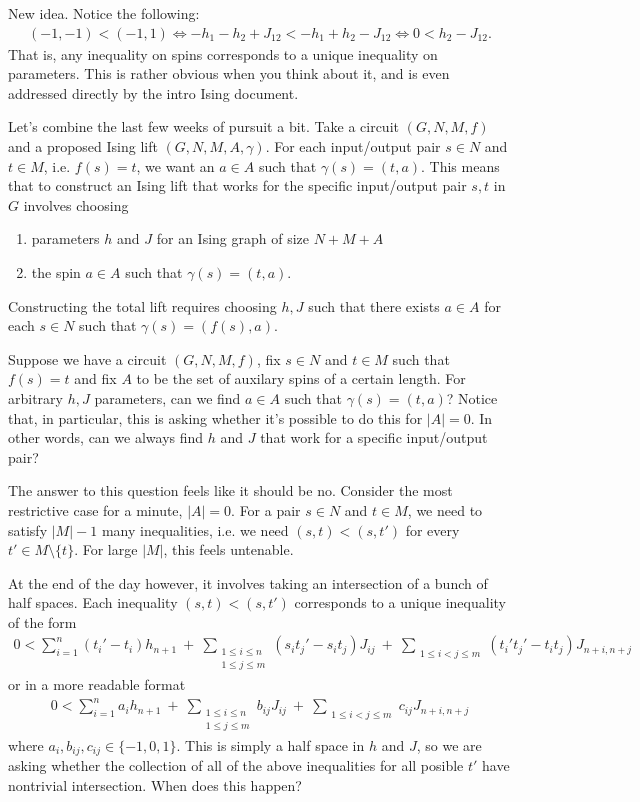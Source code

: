 New idea. Notice the following:
\begin{align*}
	(-1,-1) < (-1,1) \iff -h_1 - h_2 + J_{12} < -h_1 + h_2 - J_{12} \iff 0 < h_2 - J_{12}.
\end{align*}
That is, any inequality on spins corresponds to a unique inequality on parameters. This is rather obvious when you think about it, and is even addressed directly by the intro Ising document.

\newpage
{}
Let's combine the last few weeks of pursuit a bit. Take a circuit $(G,N,M,f)$ and a proposed Ising lift $(G,N,M,A,\gamma)$. For each input/output pair $s \in N$ and $t \in M$, i.e. $f(s) = t$, we want an $a \in A$ such that $\gamma(s) = (t,a)$. This means that to construct an Ising lift that works for the specific input/output pair $s,t$ in $G$ involves choosing
\begin{enumerate}[(1)]
	\item parameters $h$ and $J$ for an Ising graph of size $N + M + A$
	\item the spin $a \in A$ such that $\gamma(s) = (t,a)$.
\end{enumerate}
Constructing the total lift requires choosing $h,J$ such that there exists $a \in A$ for each $s \in N$ such that $\gamma(s) = (f(s),a)$.

\begin{question}\label{q:given-h-J-exist-a}
	Suppose we have a circuit $(G,N,M,f)$, fix $s \in N$ and $t \in M$ such that $f(s) = t$ and fix $A$ to be the set of auxilary spins of a certain length. For arbitrary $h,J$ parameters, can we find $a \in A$ such that $\gamma(s) = (t,a)$? Notice that, in particular, this is asking whether it's possible to do this for $|A| = 0$. In other words, can we always find $h$ and $J$ that work for a specific input/output pair?
\end{question}
The answer to this question feels like it should be no. Consider the most restrictive case for a minute, $|A| = 0$. For a pair $s \in N$ and $t \in M$, we need to satisfy $|M| - 1$ many inequalities, i.e. we need $(s,t) < (s,t')$ for every $t' \in M \setminus \{t\}$. For large $|M|$, this feels untenable.

At the end of the day however, it involves taking an intersection of a bunch of half spaces. Each inequality $(s,t) < (s,t')$ corresponds to a unique inequality of the form
\begin{align*}
	0 < \sum_{i = 1}^n (t_i' - t_i)h_{n+1} ~+~ \sum_{\substack{1 \leq i \leq n \\ 1\leq j \leq m}} (s_it_j' - s_it_j)J_{ij} ~+~ \sum_{\substack{1\leq i < j \leq m}} (t_i't_j' - t_it_j)J_{n+i,n+j}
\end{align*}
or in a more readable format
\begin{align*}
	0 < \sum_{i = 1}^n a_ih_{n+1} ~+~ \sum_{\substack{1 \leq i \leq n \\ 1\leq j \leq m}} b_{ij}J_{ij} ~+~ \sum_{\substack{1\leq i < j \leq m}} c_{ij}J_{n+i,n+j}
\end{align*}
where $a_i,b_{ij},c_{ij} \in \{-1,0,1\}$. This is simply a half space in $h$ and $J$, so we are asking whether the collection of all of the above inequalities for all posible $t'$ have nontrivial intersection. When does this happen?

